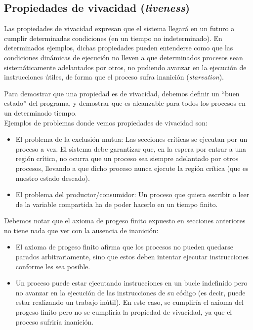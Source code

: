 \subsection{Propiedades de vivacidad (\textit{liveness})}
Las propiedades de vivacidad expresan que el sistema llegará en un futuro a cumplir determinadas condiciones (en un tiempo no indeterminado). En determinados ejemplos, dichas propiedades pueden entenderse como que las condiciones dinámicas de ejecución no lleven a que determinados procesos sean sistemáticamente adelantados por otros, no pudiendo avanzar en la ejecución de instrucciones útiles, de forma que el proceso sufra inanición (\textit{starvation}).

Para demostrar que una propiedad es de vivacidad, debemos definir un ``buen estado'' del programa, y demostrar que es alcanzable para todos los procesos en un determinado tiempo.\\

Ejemplos de problemas donde vemos propiedades de vivacidad son:
\begin{itemize}
    \item El problema de la exclusión mutua: Las secciones críticas se ejecutan por un proceso a vez. El sistema debe garantizar que, en la espera por entrar a una región crítica, no ocurra que un proceso sea siempre adelantado por otros procesos, llevando a que dicho proceso nunca ejecute la región crítica (que es nuestro estado deseado).
    \item El problema del productor/consumidor: Un proceso que quiera escribir o leer de la variable compartida ha de poder hacerlo en un tiempo finito.
\end{itemize}

Debemos notar que el axioma de progeso finito expuesto en secciones anteriores no tiene nada que ver con la ausencia de inanición:
\begin{itemize}
    \item El axioma de progeso finito afirma que los procesos no pueden quedarse parados arbitrariamente, sino que estos deben intentar ejecutar instrucciones conforme les sea posible.
    \item Un proceso puede estar ejecutando instrucciones en un bucle indefinido pero no avanzar en la ejecución de las instrucciones de su código (es decir, puede estar realizando un trabajo inútil). En este caso, se cumpliría el axioma del progeso finito pero no se cumpliría la propiedad de vivacidad, ya que el proceso sufriría inanición.
\end{itemize}

